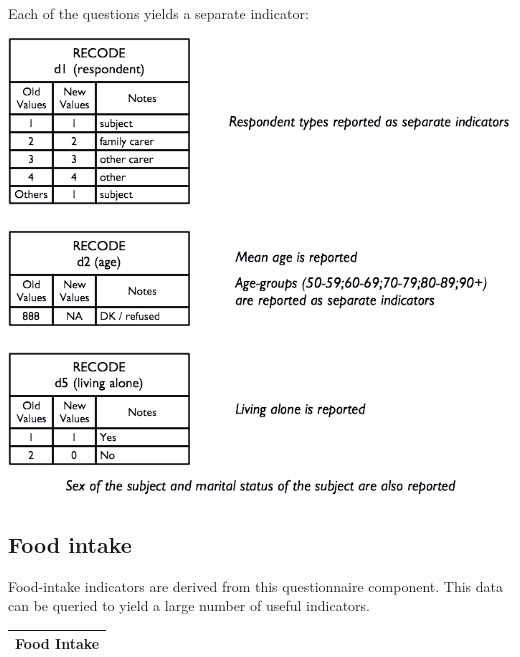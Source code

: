 \documentclass[12pt,a4paper]{book}
\theoremstyle{definition}
\theoremstyle{definition}
\theoremstyle{definition}
\theoremstyle{remark}
\begin{document}
\newpage

Each of the questions yields a separate indicator:

\begin{center}\includegraphics{figures/indicators03} \end{center}

\hypertarget{food-intake}{%
\subsection{Food intake}\label{food-intake}}

Food-intake indicators are derived from this questionnaire component.
This data can be queried to yield a large number of useful indicators.

\newpage

\begin{longtable}[]{@{}c@{}}
\toprule
\begin{minipage}[t]{0.97\columnwidth}\centering
\textbf{Food Intake}\strut
\end{minipage}\tabularnewline
\bottomrule
\end{longtable}
\end{document}
